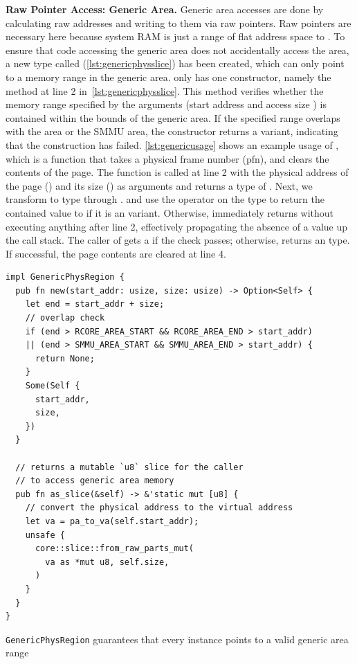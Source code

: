 \textbf{Raw Pointer Access: Generic Area.}
Generic area accesses are done by calculating raw addresses and writing to them
via raw pointers. Raw pointers are necessary here because system RAM is just a
range of flat address space to \rustcore{}. To ensure that code accessing the
generic area does not accidentally access the \rustcore{} area,
a new type called 
(\autoref{lst:genericphysslice}) has been created, which can only point to a
memory range in the generic area.
 only has one constructor, namely the 
method at line 2 in~\autoref{lst:genericphysslice}. This method verifies whether
the memory range specified by the arguments (start address  and
access size ) is contained within the bounds of the generic area.
If the specified range overlaps with the \rustcore{} area or the SMMU area, the constructor
returns a  variant, indicating that the construction has failed.
\autoref{lst:genericusage} shows an example usage of
, which is a function that takes a physical frame number
(pfn), and clears the contents of the page.
The  function is called at line 2 with the
physical address of the page () and its size
() as arguments and returns a type of
.
Next, we transform  to  type through .
and use the  operator on the  type to return the
contained value to  if it is an  variant.
Otherwise,  immediately returns 
without executing anything after line 2,
effectively propagating the absence of a value up the call stack.
The caller of  gets a
 if the check passes; otherwise,
 returns an  type.
If successful, the page contents are cleared at line 4.

\begin{listing}[hbtp]
    \begin{verbatim}
impl GenericPhysRegion {
  pub fn new(start_addr: usize, size: usize) -> Option<Self> {
    let end = start_addr + size;
    // overlap check
    if (end > RCORE_AREA_START && RCORE_AREA_END > start_addr)
    || (end > SMMU_AREA_START && SMMU_AREA_END > start_addr) {
      return None;
    }
    Some(Self {
      start_addr,
      size,
    })
  }

  // returns a mutable `u8` slice for the caller
  // to access generic area memory
  pub fn as_slice(&self) -> &'static mut [u8] {
    // convert the physical address to the virtual address
    let va = pa_to_va(self.start_addr);
    unsafe {
      core::slice::from_raw_parts_mut(
        va as *mut u8, self.size,
      )
    }
  }
}
    \end{verbatim}
    \caption{\texttt{GenericPhysRegion} guarantees that every instance points to a valid generic area range}
    \label{lst:genericphysslice}
    \vspace{-0.2cm}
\end{listing}

